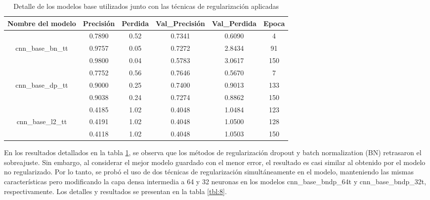 \begin{table}[!ht]
	\centering
	\begin{tabular}{|c|c|c|c|c|c|}
		\hline
		\textbf{Nombre del modelo} & \textbf{Precisión} & \textbf{Perdida} & \textbf{Val\_Precisión} & \textbf{Val\_Perdida} & \textbf{Epoca} \\ \hline
		~ & 0.7890 & 0.52 & 0.7341 & 0.6090 & 4 \\ \cline{2-6} 
		cnn\_base\_bn\_tt & 0.9757 & 0.05 & 0.7272 & 2.8434 & 91 \\ \cline{2-6} 
		~ & 0.9800 & 0.04 & 0.5783 & 3.0617 & 150 \\ \hline
		~ & 0.7752 & 0.56 & 0.7646 & 0.5670 & 7 \\ \cline{2-6} 
		cnn\_base\_dp\_tt & 0.9000 & 0.25 & 0.7400 & 0.9013 & 133 \\ \cline{2-6} 
		~ & 0.9038 & 0.24 & 0.7274 & 0.8862 & 150 \\ \hline
		~ & 0.4185 & 1.02 & 0.4048 & 1.0484 & 123 \\ \cline{2-6} 
		cnn\_base\_l2\_tt & 0.4191 & 1.02 & 0.4048 & 1.0500 & 128 \\ \cline{2-6} 
		~ & 0.4118 & 1.02 & 0.4048 & 1.0503 & 150 \\ \hline
	\end{tabular}
	\caption{Detalle de los modelos base utilizados junto con las técnicas de regularización aplicadas}
	\label{tbl:7}
\end{table}

En los resultados detallados en la tabla \ref{tbl:7}, se observa que los métodos de regularización dropout y batch normalization (BN) retrasaron el sobreajuste. Sin embargo, al considerar el mejor modelo guardado con el menor error, el resultado es casi similar al obtenido por el modelo no regularizado. Por lo tanto, se probó el uso de dos técnicas de regularización simultáneamente en el modelo, manteniendo las mismas características pero modificando la capa densa intermedia a 64 y 32 neuronas en los modelos cnn\_base\_bndp\_64t y cnn\_base\_bndp\_32t, respectivamente. Los detalles y resultados se presentan en la tabla \ref{tbl:8}.

